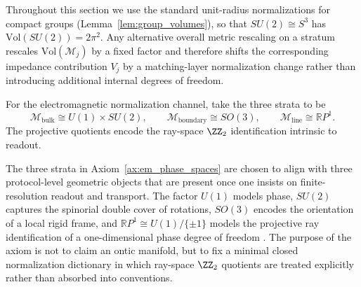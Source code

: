 \begin{remark}\label{rem:metric_normalization_volumes}
Throughout this section we use the standard unit-radius normalizations for compact groups (Lemma~\ref{lem:group_volumes}), so that $SU(2)\cong S^3$ has $\mathrm{Vol}(SU(2))=2\pi^2$.
Any alternative overall metric rescaling on a stratum rescales $\mathrm{Vol}(\mathcal{M}_j)$ by a fixed factor and therefore shifts the corresponding impedance contribution $V_j$ by a matching-layer normalization change rather than introducing additional internal degrees of freedom.
\end{remark}

\begin{axiom}\label{ax:em_phase_spaces}
For the electromagnetic normalization channel, take the three strata to be
\[
\mathcal{M}_{\mathrm{bulk}}\cong U(1)\times SU(2),\qquad
\mathcal{M}_{\mathrm{boundary}}\cong SO(3),\qquad
\mathcal{M}_{\mathrm{line}}\cong \mathbb{R}P^1.
\]
The projective quotients encode the ray-space $\ZZ_2$ identification intrinsic to readout.
\end{axiom}

\begin{remark}\label{rem:em_strata_meaning}
The three strata in Axiom~\ref{ax:em_phase_spaces} are chosen to align with three protocol-level geometric objects that are present once one insists on finite-resolution readout and transport.
The factor $U(1)$ models phase, $SU(2)$ captures the spinorial double cover of rotations, $SO(3)$ encodes the orientation of a local rigid frame, and $\mathbb{R}P^1\cong U(1)/\{\pm 1\}$ models the projective ray identification of a one-dimensional phase degree of freedom \cite{Nakahara2003,HallLieGroups2015}.
The purpose of the axiom is not to claim an ontic manifold, but to fix a minimal closed normalization dictionary in which ray-space $\ZZ_2$ quotients are treated explicitly rather than absorbed into conventions.
\end{remark}

